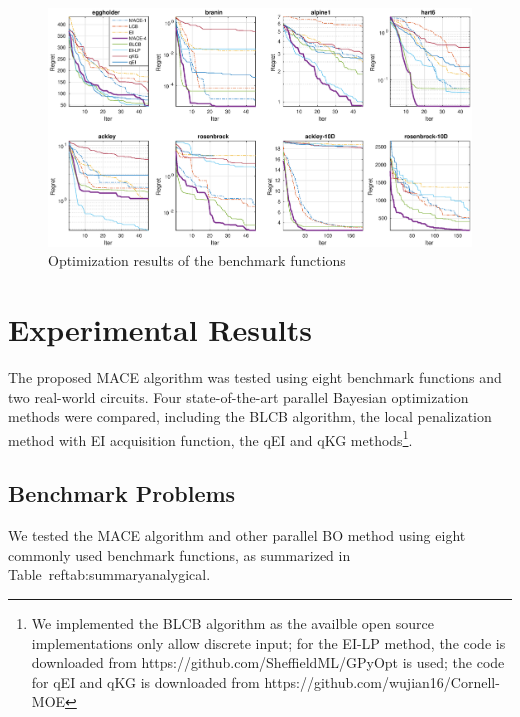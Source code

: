 
\begin{figure}[htbp]
    \begin{center}
        \centerline{\includegraphics[width=1.0\linewidth]{./img/convplot.eps}}
        \caption{Optimization results of the benchmark functions}
        \label{fig:CovPlotBenchmark}
    \end{center}
\end{figure}

\section{Experimental Results}

The proposed MACE algorithm was tested using eight benchmark functions and two
real-world circuits. Four state-of-the-art parallel Bayesian optimization
methods were compared, including the BLCB algorithm, the local penalization
method with EI acquisition function, the qEI and qKG methods\footnote{We
implemented the BLCB algorithm as the availble open source implementations only
allow discrete input; for the EI-LP method, the code is downloaded from
https://github.com/SheffieldML/GPyOpt is used; the code for qEI and qKG is
downloaded from https://github.com/wujian16/Cornell-MOE}.

\subsection{Benchmark Problems}

We tested the MACE algorithm and other parallel BO method using eight commonly used benchmark
functions, as summarized in Table~ref{tab:summaryanalygical}.


